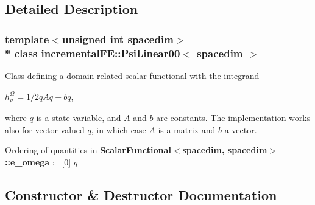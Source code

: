 \subsection{Detailed Description}
\subsubsection*{template$<$unsigned int spacedim$>$\\*
class incremental\+F\+E\+::\+Psi\+Linear00$<$ spacedim $>$}

Class defining a domain related scalar functional with the integrand

$h^\Omega_\rho = 1/2 q A q + b q$,

where $q$ is a state variable, and $A$ and $b$ are constants. The implementation works also for vector valued $q$, in which case $A$ is a matrix and $b$ a vector.

Ordering of quantities in {\bf Scalar\+Functional$<$spacedim, spacedim$>$\+::e\+\_\+omega} \+:~\newline
 \mbox{[}0\mbox{]} $q$ 

\subsection{Constructor \& Destructor Documentation}
